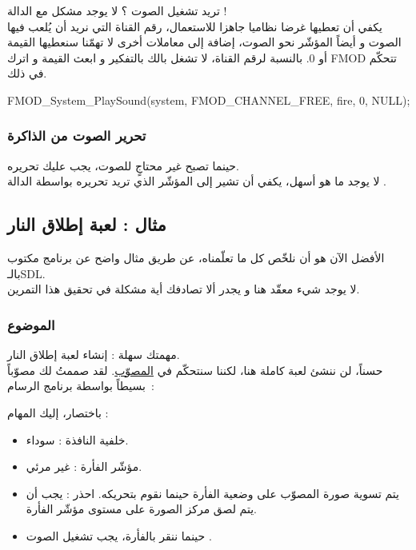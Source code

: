 تريد تشغيل الصوت ؟ لا يوجد مشكل مع الدالة
 !\\
يكفي أن تعطيها غرضا نظاميا جاهزا للاستعمال، رقم القناة التي نريد أن يُلعب فيها الصوت و أيضاً المؤشّر نحو الصوت، إضافة إلى معاملات أخرى لا تهمّنا سنعطيها القيمة
أو 0. بالنسبة لرقم القناة، لا تشغل بالك بالتفكير و ابعث القيمة
و اترك
\textenglish{FMOD}
تتحكّم في ذلك.

\begin{Csource}
FMOD_System_PlaySound(system, FMOD_CHANNEL_FREE, fire, 0, NULL);
\end{Csource}

\subsubsection{تحرير الصوت من الذاكرة}

حينما تصبح غير محتاجٍ للصوت، يجب عليك تحريره. \\
لا يوجد ما هو أسهل، يكفي أن تشير إلى المؤشّر الذي تريد تحريره بواسطة الدالة
.


\subsection{مثال : لعبة إطلاق النار}

الأفضل الآن هو أن نلخّص كل ما تعلّمناه، عن طريق مثال واضح عن برنامج مكتوب بالـ\textenglish{SDL}.\\
لا يوجد شيء معقّد هنا و يجدر ألا تصادفك أية مشكلة في تحقيق هذا التمرين.

\subsubsection{الموضوع}

مهمتك سهلة : إنشاء لعبة إطلاق النار.\\
حسناً، لن ننشئ لعبة كاملة هنا، لكننا سنتحكّم في
\underline{المصوّب}.
 لقد صممتُ لك مصوّباً بسيطاً بواسطة برنامج الرسام~:


باختصار، إليك المهام :

\begin{itemize}
	\item خلفية النافذة : سوداء.
	\item مؤشّر الفأرة : غير مرئي.
	\item يتم تسوية صورة المصوّب على وضعية الفأرة حينما نقوم بتحريكه. احذر : يجب أن يتم لصق مركز الصورة على مستوى مؤشّر الفأرة.
	\item حينما ننقر بالفأرة، يجب تشغيل الصوت
	.
\end{itemize}

